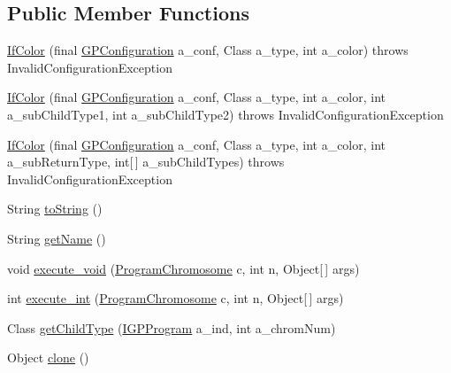 \subsection*{Public Member Functions}
\begin{DoxyCompactItemize}
\item 
\hyperlink{classexamples_1_1gp_1_1tictactoe_1_1_if_color_a01c1158b25a35ef3a225705c418d06b6}{If\-Color} (final \hyperlink{classorg_1_1jgap_1_1gp_1_1impl_1_1_g_p_configuration}{G\-P\-Configuration} a\-\_\-conf, Class a\-\_\-type, int a\-\_\-color)  throws Invalid\-Configuration\-Exception 
\item 
\hyperlink{classexamples_1_1gp_1_1tictactoe_1_1_if_color_a3bec2809d5cc368e9c1be5207d5c5f28}{If\-Color} (final \hyperlink{classorg_1_1jgap_1_1gp_1_1impl_1_1_g_p_configuration}{G\-P\-Configuration} a\-\_\-conf, Class a\-\_\-type, int a\-\_\-color, int a\-\_\-sub\-Child\-Type1, int a\-\_\-sub\-Child\-Type2)  throws Invalid\-Configuration\-Exception 
\item 
\hyperlink{classexamples_1_1gp_1_1tictactoe_1_1_if_color_a5a4e0a5e75d3eec8af2be2bd319b26c4}{If\-Color} (final \hyperlink{classorg_1_1jgap_1_1gp_1_1impl_1_1_g_p_configuration}{G\-P\-Configuration} a\-\_\-conf, Class a\-\_\-type, int a\-\_\-color, int a\-\_\-sub\-Return\-Type, int\mbox{[}$\,$\mbox{]} a\-\_\-sub\-Child\-Types)  throws Invalid\-Configuration\-Exception 
\item 
String \hyperlink{classexamples_1_1gp_1_1tictactoe_1_1_if_color_a2612f8334bf0bd66dfa672487a0e71ad}{to\-String} ()
\item 
String \hyperlink{classexamples_1_1gp_1_1tictactoe_1_1_if_color_ad7c3d673b9e96b60c03fc1e70ffcc31d}{get\-Name} ()
\item 
void \hyperlink{classexamples_1_1gp_1_1tictactoe_1_1_if_color_a2309d68e237dc4044d0866aca11d29ca}{execute\-\_\-void} (\hyperlink{classorg_1_1jgap_1_1gp_1_1impl_1_1_program_chromosome}{Program\-Chromosome} c, int n, Object\mbox{[}$\,$\mbox{]} args)
\item 
int \hyperlink{classexamples_1_1gp_1_1tictactoe_1_1_if_color_a7834487498f2631fcf5620749ed45662}{execute\-\_\-int} (\hyperlink{classorg_1_1jgap_1_1gp_1_1impl_1_1_program_chromosome}{Program\-Chromosome} c, int n, Object\mbox{[}$\,$\mbox{]} args)
\item 
Class \hyperlink{classexamples_1_1gp_1_1tictactoe_1_1_if_color_ad327bcd53f7ac28ef31bf2410f85d945}{get\-Child\-Type} (\hyperlink{interfaceorg_1_1jgap_1_1gp_1_1_i_g_p_program}{I\-G\-P\-Program} a\-\_\-ind, int a\-\_\-chrom\-Num)
\item 
Object \hyperlink{classexamples_1_1gp_1_1tictactoe_1_1_if_color_a5a1ea962799862cbb6eaa8b1555fb598}{clone} ()
\end{DoxyCompactItemize}
